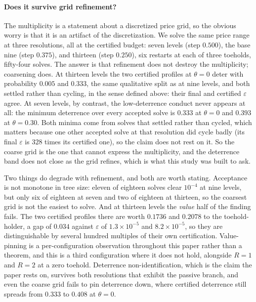 \documentclass[11pt,a4paper]{article}
\newcommand{\theold}{\theta}   %
\begin{document}
\paragraph{Does it survive grid refinement?} The multiplicity is a statement about a discretized price grid, so the obvious worry is that it is an artifact of the discretization. We solve the same price range at three resolutions, all at the certified budget: seven levels (step $0.500$), the base nine (step $0.375$), and thirteen (step $0.250$), six restarts at each of three toeholds, fifty-four solves. The answer is that refinement does not destroy the multiplicity; coarsening does. At thirteen levels the two certified profiles at $\theold=0$ deter with probability $0.005$ and $0.333$, the same qualitative split as at nine levels, and both settled rather than cycling, in the sense defined above: their final and certified $\varepsilon$ agree. At seven levels, by contrast, the low-deterrence conduct never appears at all: the minimum deterrence over every accepted solve is $0.333$ at $\theold=0$ and $0.393$ at $\theold=0.30$. Both minima come from solves that settled rather than cycled, which matters because one other accepted solve at that resolution did cycle badly (its final $\varepsilon$ is $328$ times its certified one), so the claim does not rest on it. So the coarse grid is the one that cannot express the multiplicity, and the deterrence band does not close as the grid refines, which is what this study was built to ask.

Two things do degrade with refinement, and both are worth stating. Acceptance is not monotone in tree size: eleven of eighteen solves clear $10^{-4}$ at nine levels, but only six of eighteen at seven and two of eighteen at thirteen, so the coarsest grid is not the easiest to solve. And at thirteen levels the \emph{value} half of the finding fails. The two certified profiles there are worth $0.1736$ and $0.2078$ to the toehold-holder, a gap of $0.034$ against $\varepsilon$ of $1.3\times10^{-5}$ and $8.2\times10^{-5}$, so they are distinguishable by several hundred multiples of their own certification. Value-pinning is a per-configuration observation throughout this paper rather than a theorem, and this is a third configuration where it does not hold, alongside $R=1$ and $R=2$ at a zero toehold. Deterrence non-identification, which is the claim the paper rests on, survives both resolutions that exhibit the passive branch, and even the coarse grid fails to pin deterrence down, where certified deterrence still spreads from $0.333$ to $0.408$ at $\theold=0$.
\end{document}
